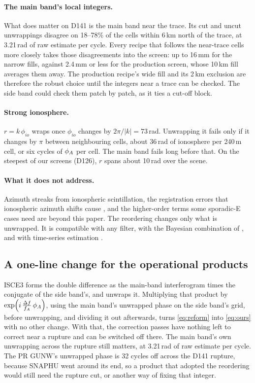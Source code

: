\paragraph{The main band's local integers.} What does matter on D141 is the main band near the trace. Its cut and uncut
unwrappings disagree on 18--78\% of the cells within 6\,km north of the trace, at 3.21\,rad of raw estimate per cycle.
Every recipe that follows the near-trace cells more closely takes those disagreements into the screen: up to 16\,mm
for the narrow fills, against 2.4\,mm or less for the production screen, whose 10\,km fill averages them away. The
production recipe's wide fill and its 2\,km exclusion are therefore the robust choice until the integers near a trace
can be checked. The side band could check them patch by patch, as it ties a cut-off block.

\paragraph{Strong ionosphere.} $r = k\,\phi_{io}$ wraps once $\phi_{io}$ changes by $2\pi/|k| = 73$\,rad. Unwrapping it
fails only if it changes by $\pi$ between neighbouring cells, about 36\,rad of ionosphere per 240\,m cell, or six cycles
of $\phi_A$ per cell. The main band fails long before that. On the steepest of our screens (D126), $r$ spans about
10\,rad over the scene.

\paragraph{What it does not address.} Azimuth streaks from ionospheric scintillation, the registration errors that
ionospheric azimuth shifts cause \citep{wegmuller2024palsar3}, and the higher-order terms some sporadic-E cases need
\citep{furuya2017midlatitude} are beyond this paper. The reordering changes only what is unwrapped. It is compatible
with any filter, with the Bayesian combination of \citet{gomba2017bayesian}, and with time-series estimation
\citep{fattahi2017insar,piromthong2026ionospheric}.

\subsection{A one-line change for the operational products}
ISCE3 forms the double difference as the main-band interferogram times the conjugate of the side band's, and unwraps
it. Multiplying that product by $\exp\!\left(i\,\frac{\Delta f}{f_A}\,\phi_A\right)$, using the main band's unwrapped
phase on the side band's grid, before unwrapping, and dividing it out afterwards, turns \eqref{eq:reform} into
\eqref{eq:ours} with no other change. With that, the correction passes have nothing left to correct near a rupture
and can be switched off there. The main band's own unwrapping across the rupture still matters, at 3.21\,rad of
raw estimate per cycle. The PR GUNW's unwrapped phase is 32 cycles off across the D141 rupture, because SNAPHU went
around its end, so a product that adopted the reordering would still need the rupture cut, or another way of
fixing that integer.
